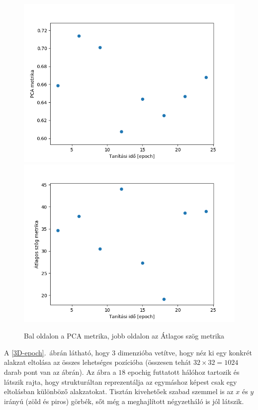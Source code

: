 \begin{figure}[h!]
  
  \includegraphics[width=0.5\linewidth]{metrics/vae_epoch-pca.png}
  \includegraphics[width=0.5\linewidth]{metrics/vae_epoch-as.png}
  \caption{Bal oldalon a PCA metrika, jobb oldalon az Átlagos szög metrika}\label{epoch-metrics}
\end{figure}

A \ref{3D-epoch}.~ábrán látható, hogy $3$ dimenzióba vetítve, hogy néz ki egy konkrét alakzat eltolása az összes lehetséges pozícióba (összesen tehát $32\times32=1024$ darab pont van az ábrán). Az ábra a $18$ epochig futtatott hálóhoz tartozik és látszik rajta, hogy strukturáltan reprezentálja az egymáshoz képest csak egy eltolásban különböző alakzatokat. Tisztán kivehetőek szabad szemmel is az $x$ és $y$ irányú (zöld és piros) görbék, sőt még a meghajlított négyzetháló is jól látszik.

